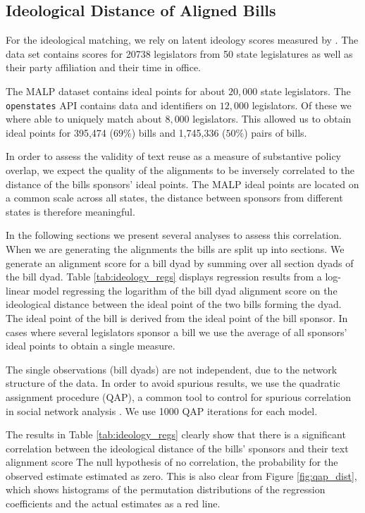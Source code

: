 \documentclass[12pt]{article} %
\begin{document}
\subsection{Ideological Distance of Aligned Bills}



For the ideological matching, we rely on latent ideology scores measured by \citep{shor2011}. The data set contains scores for 20738 legislators from 50 state legislatures as well as their party affiliation and their time in office. 

The MALP dataset contains ideal points for about $20,000$ state legislators. The \texttt{openstates} API contains data and identifiers on $12,000$ legislators. Of these we where able to uniquely match about $8,000$ legislators. This allowed us to obtain ideal points for 395,474 ($69\%$) bills and 1,745,336 ($50\%$) pairs of bills. 

In order to assess the validity of text reuse as a measure of substantive policy overlap, we expect the quality of the alignments to be inversely correlated to the distance of the bills sponsors' ideal points. The MALP ideal points are located on a common scale across all states, the distance between sponsors from different states is therefore meaningful. 

In the following sections we present several analyses to assess this correlation. When we are generating the alignments the bills are split up into sections. We generate an alignment score for a bill dyad by summing over all section dyads of the bill dyad.  Table \ref{tab:ideology_regs} displays regression results from a log-linear model regressing the logarithm of the bill dyad alignment score on the ideological distance between the ideal point of the two bills forming the dyad. The ideal point of the bill is derived from the ideal point of the bill sponsor. In cases where several legislators sponsor a bill we use the average of all sponsors' ideal points to obtain a single measure.

The single observations (bill dyads) are not independent, due to the network structure of the data. In order to avoid spurious results, we use the quadratic assignment procedure (QAP), a common tool to control for spurious correlation in social network analysis \citet{krackardt1987qap}. We use 1000 QAP iterations for each model.



The results in Table \ref{tab:ideology_regs} clearly show that there is a significant correlation between the ideological distance of the bills' sponsors and their text alignment score The null hypothesis of no correlation, the probability for the observed estimate estimated as zero. This is also clear from Figure \ref{fig:qap_dist}, which shows histograms of the permutation distributions of the regression coefficients and the actual estimates as a red line. 
\end{document}
